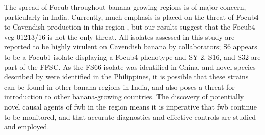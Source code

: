 The spread of \ac{Focub} throughout banana-growing regions is of major concern, particularly in India. Currently, much emphasis is placed on the threat of \ac{Focub4} to Cavendish production in this region \parencite{Viljoen2020, Damodaran2019}, but our results suggest that the \ac{Focub4} \ac{vcg} 01213/16 is not the only threat. All isolates assessed in this study are reported to be highly virulent on Cavendish banana by collaborators; S6 appears to be a \ac{Focub1} isolate displaying a \ac{Focub4} phenotype and SY-2, S16, and S32 are part of the \ac{FFSC}. As the FS66 isolate was identified in China, and novel species described by \textcite{Nozawa2023} were identified in the Philippines, it is possible that these strains can be found in other banana regions in India, and also poses a threat for introduction to other banana-growing countries. The discovery of potentially novel causal agents of \ac{fwb} in the region means it is imperative that \ac{fwb} continue to be monitored, and that accurate diagnostics and effective controls are studied and employed.  
